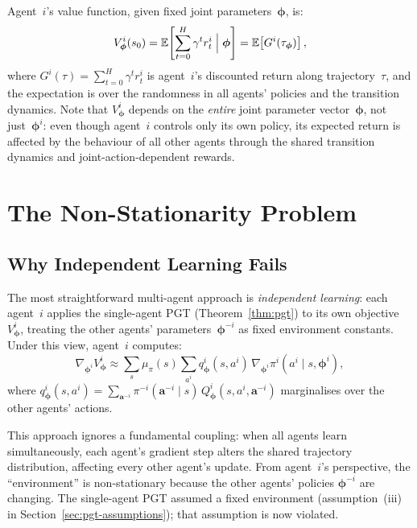 Agent~$i$'s value function, given fixed joint parameters~$\bm{\phi}$, is:
\begin{equation}\label{eq:multi-agent-value}
  V^i_{\bm{\phi}}(s_0) = \mathbb{E}\!\left[\sum_{t=0}^H\gamma^t r_t^i\;\Big|\;\bm{\phi}\right] = \mathbb{E}\!\left[G^i(\tau_{\bm{\phi}})\right],
\end{equation}
where $G^i(\tau)=\sum_{t=0}^H\gamma^t r_t^i$ is agent~$i$'s discounted return along trajectory~$\tau$, and the expectation is over the randomness in all agents' policies and the transition dynamics. Note that $V^i_{\bm{\phi}}$ depends on the \emph{entire} joint parameter vector~$\bm{\phi}$, not just~$\bm{\phi}^i$: even though agent~$i$ controls only its own policy, its expected return is affected by the behaviour of all other agents through the shared transition dynamics and joint-action-dependent rewards.

\section{The Non-Stationarity Problem}
\label{sec:non-stationarity}

\subsection{Why Independent Learning Fails}
\label{subsec:independent-learning}

The most straightforward multi-agent approach is \emph{independent learning}: each agent~$i$ applies the single-agent PGT (Theorem~\ref{thm:pgt}) to its own objective $V^i_{\bm{\phi}}$, treating the other agents' parameters~$\bm{\phi}^{-i}$ as fixed environment constants. Under this view, agent~$i$ computes:
\begin{equation}\label{eq:independent-pg}
  \nabla_{\bm{\phi}^i} V^i_{\bm{\phi}} \approx \sum_s\mu_{\pi}(s)\sum_{a^i} q^i_{\bm{\phi}}(s,a^i)\,\nabla_{\bm{\phi}^i}\pi^i(a^i\mid s,\bm{\phi}^i),
\end{equation}
where $q^i_{\bm{\phi}}(s,a^i) = \sum_{\bm{a}^{-i}}\pi^{-i}(\bm{a}^{-i}\mid s)\,Q^i_{\bm{\phi}}(s,a^i,\bm{a}^{-i})$ marginalises over the other agents' actions.

This approach ignores a fundamental coupling: when all agents learn simultaneously, each agent's gradient step alters the shared trajectory distribution, affecting every other agent's update. From agent~$i$'s perspective, the ``environment'' is non-stationary because the other agents' policies $\bm{\phi}^{-i}$ are changing. The single-agent PGT assumed a fixed environment (assumption~(iii) in Section~\ref{sec:pgt-assumptions}); that assumption is now violated.

